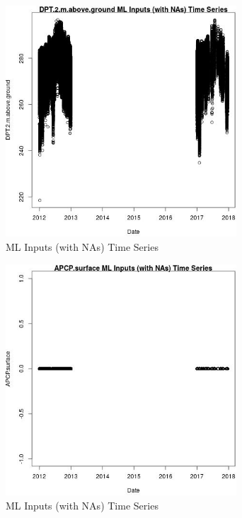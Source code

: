 \begin{figure} 
\centering  
\includegraphics[width=0.77\textwidth]{Code_Outputs/Report_ML_input_PM25_Step4_part_e_de_duplicated_aves_compiled_2019-05-14wNAs_DPT2mabovegroundvDate.jpg} 
\caption{\label{fig:Report_ML_input_PM25_Step4_part_e_de_duplicated_aves_compiled_2019-05-14wNAsDPT2mabovegroundvDate}ML Inputs (with NAs) Time Series} 
\end{figure} 
 

\clearpage 

\begin{figure} 
\centering  
\includegraphics[width=0.77\textwidth]{Code_Outputs/Report_ML_input_PM25_Step4_part_e_de_duplicated_aves_compiled_2019-05-14wNAs_APCPsurfacevDate.jpg} 
\caption{\label{fig:Report_ML_input_PM25_Step4_part_e_de_duplicated_aves_compiled_2019-05-14wNAsAPCPsurfacevDate}ML Inputs (with NAs) Time Series} 
\end{figure} 
 

